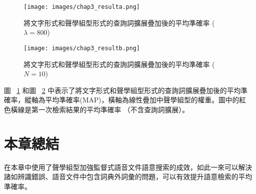 \begin{figure}
\centering
\texttt{[image: images/chap3\_resulta.png]}
\caption{將文字形式和聲學組型形式的查詢詞擴展疊加後的平均準確率 ($\lambda = 800$)} \label{fig:chap3_resulta}
\end{figure}

\begin{figure}
\centering
\texttt{[image: images/chap3\_resultb.png]}
\caption{將文字形式和聲學組型形式的查詢詞擴展疊加後的平均準確率 ($N=10$)} \label{fig:chap3_resultb}
\end{figure}

圖 ~\ref{fig:chap3_resulta} 和圖 ~\ref{fig:chap3_resultb} 中表示了將文字形式和聲學組型形式的查詢詞擴展疊加後的平均準確率，縱軸為平均準確率(MAP)，橫軸為線性疊加中聲學組型的權重。圖中的紅色橫線是第一次檢索結果的平均準確率 （不含查詢詞擴展）。

\section{本章總結}
在本章中使用了聲學組型加強監督式語音文件語意搜索的成效，如此一來可以解決諸如辨識錯誤、語音文件中包含詞典外詞彙的問題，可以有效提升語意檢索的平均準確率。

